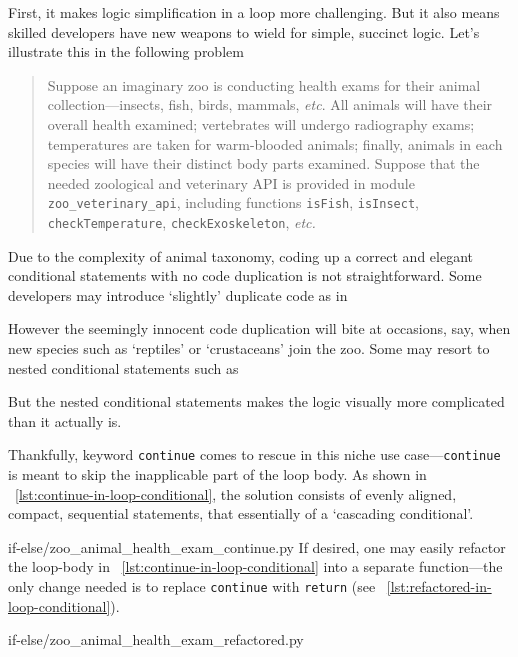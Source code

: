 \documentclass[oneside,11pt]{book}
\theoremstyle{definition}
\theoremstyle{remark}
\newcommand{\code}[1]{\mbox{\lstinline{#1}}}
\begin{document}
First, it makes logic simplification in a loop more challenging.
But it also means skilled developers have new weapons to wield for simple, succinct logic.
Let's illustrate this in the following problem
\begin{quote}
    Suppose an imaginary zoo is conducting health exams for their animal collection---insects,
    fish, birds, mammals, \textit{etc}.
    All animals will have their overall health examined;
    vertebrates will undergo radiography exams;
    temperatures are taken for warm-blooded animals;
    finally, animals in each species will have their distinct body parts examined.
    Suppose that the needed zoological and veterinary API is provided in
    module \code{zoo_veterinary_api}, including functions \code{isFish},
    \code{isInsect}, \code{checkTemperature}, \code{checkExoskeleton}, \textit{etc.}
\end{quote}


Due to the complexity of animal taxonomy, coding up a correct and elegant conditional statements
with no code duplication is not straightforward.
Some developers may introduce `slightly' duplicate code as in

However the seemingly innocent code duplication will bite at occasions, say,
when new species such as `reptiles' or `crustaceans' join the zoo.
Some may resort to nested conditional statements such as

But the nested conditional statements makes the logic visually more complicated than it actually is.


Thankfully, keyword \code{continue} comes to rescue in this niche use case---\code{continue}
is meant to skip the inapplicable part of the loop body.
As shown in ~\autoref{lst:continue-in-loop-conditional}, the solution consists of evenly aligned,
compact, sequential statements, that essentially of a `cascading conditional'.

{if-else/zoo_animal_health_exam_continue.py}
If desired, one may easily refactor the loop-body in ~\autoref{lst:continue-in-loop-conditional}
into a separate function---the only change needed is to replace
\code{continue} with \code{return} (see ~\autoref{lst:refactored-in-loop-conditional}).
\begin{clisting}[ht]
    
    {if-else/zoo_animal_health_exam_refactored.py}
\end{clisting}
\end{document}
